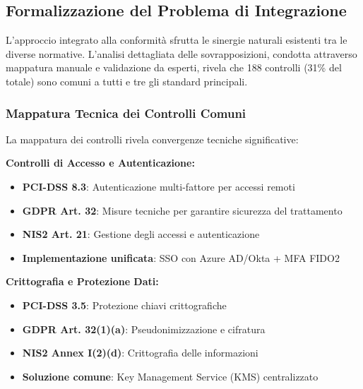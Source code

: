 \subsection{Formalizzazione del Problema di Integrazione}

L'approccio integrato alla conformità sfrutta le sinergie naturali esistenti tra le diverse normative. L'analisi dettagliata delle sovrapposizioni, condotta attraverso mappatura manuale e validazione da esperti, rivela che 188 controlli (31\% del totale) sono comuni a tutti e tre gli standard principali.

\subsubsection{Mappatura Tecnica dei Controlli Comuni}

La mappatura dei controlli rivela convergenze tecniche significative:

\textbf{Controlli di Accesso e Autenticazione:}
\begin{itemize}
    \item \textbf{PCI-DSS 8.3}: Autenticazione multi-fattore per accessi remoti
    \item \textbf{GDPR Art. 32}: Misure tecniche per garantire sicurezza del trattamento
    \item \textbf{NIS2 Art. 21}: Gestione degli accessi e autenticazione
    \item \textbf{Implementazione unificata}: SSO con Azure AD/Okta + MFA FIDO2
\end{itemize}

\textbf{Crittografia e Protezione Dati:}
\begin{itemize}
    \item \textbf{PCI-DSS 3.5}: Protezione chiavi crittografiche
    \item \textbf{GDPR Art. 32(1)(a)}: Pseudonimizzazione e cifratura
    \item \textbf{NIS2 Annex I(2)(d)}: Crittografia delle informazioni
    \item \textbf{Soluzione comune}: Key Management Service (KMS) centralizzato
\end{itemize}

